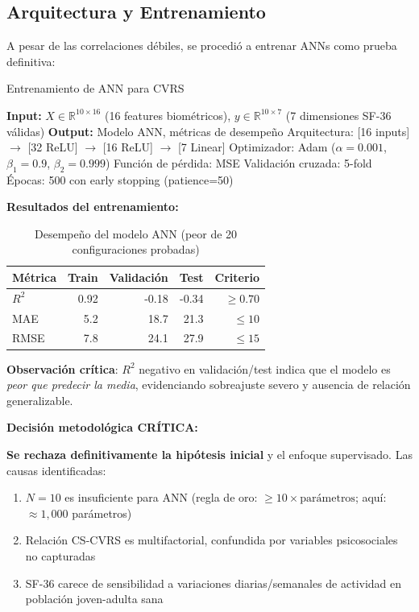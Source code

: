 \documentclass[12pt,letterpaper,twoside]{report}
\newcommand{\R}{\mathbb{R}}
\begin{document}
\subsection{Arquitectura y Entrenamiento}

A pesar de las correlaciones débiles, se procedió a entrenar ANNs como prueba definitiva:

\begin{algorithm}[H]
\caption{Entrenamiento de ANN para CVRS}
\label{alg:ann_training}
\begin{algorithmic}[1]
\State \textbf{Input:} $X \in \R^{10 \times 16}$ (16 features biométricos), $y \in \R^{10 \times 7}$ (7 dimensiones SF-36 válidas)
\State \textbf{Output:} Modelo ANN, métricas de desempeño
\State
\State Arquitectura: [16 inputs] $\to$ [32 ReLU] $\to$ [16 ReLU] $\to$ [7 Linear]
\State Optimizador: Adam ($\alpha=0.001$, $\beta_1=0.9$, $\beta_2=0.999$)
\State Función de pérdida: MSE
\State Validación cruzada: 5-fold
\State Épocas: 500 con early stopping (patience=50)
\end{algorithmic}
\end{algorithm}

\begin{calculobox}
\textbf{Resultados del entrenamiento:}

\begin{table}[H]
\centering
\begin{tabular}{@{}lrrrr@{}}
\toprule
\textbf{Métrica} & \textbf{Train} & \textbf{Validación} & \textbf{Test} & \textbf{Criterio} \\
\midrule
$R^2$            & 0.92  & -0.18 & -0.34 & $\geq 0.70$ \\
MAE              & 5.2   & 18.7  & 21.3  & $\leq 10$ \\
RMSE             & 7.8   & 24.1  & 27.9  & $\leq 15$ \\
\bottomrule
\end{tabular}
\caption{Desempeño del modelo ANN (peor de 20 configuraciones probadas)}
\label{tab:ann_results}
\end{table}

\textbf{Observación crítica}: $R^2$ negativo en validación/test indica que el modelo es \textit{peor que predecir la media}, evidenciando sobreajuste severo y ausencia de relación generalizable.
\end{calculobox}

\begin{decisionbox}
\textbf{Decisión metodológica CRÍTICA:}

\textbf{Se rechaza definitivamente la hipótesis inicial} y el enfoque supervisado. Las causas identificadas:
\begin{enumerate}[noitemsep]
    \item $N=10$ es insuficiente para ANN (regla de oro: $\geq 10 \times \text{parámetros}$; aquí: $\approx 1,000$ parámetros)
    \item Relación CS-CVRS es multifactorial, confundida por variables psicosociales no capturadas
    \item SF-36 carece de sensibilidad a variaciones diarias/semanales de actividad en población joven-adulta sana
\end{enumerate}
\end{decisionbox}
\end{document}
